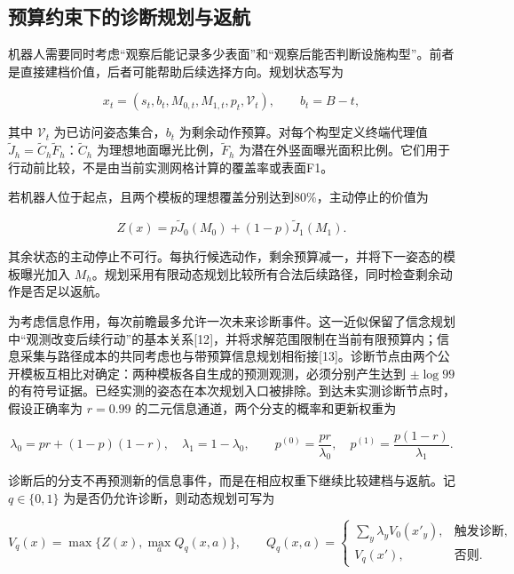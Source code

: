 \documentclass[11pt,a4paper]{article}
\numberwithin{equation}{section}
\begin{document}
\hypertarget{ux9884ux7b97ux7ea6ux675fux4e0bux7684ux8bcaux65adux89c4ux5212ux4e0eux8fd4ux822a}{%
\subsection{预算约束下的诊断规划与返航}\label{ux9884ux7b97ux7ea6ux675fux4e0bux7684ux8bcaux65adux89c4ux5212ux4e0eux8fd4ux822a}}

机器人需要同时考虑``观察后能记录多少表面''和``观察后能否判断设施构型''。前者是直接建档价值，后者可能帮助后续选择方向。规划状态写为

\begin{equation}
x_t=(s_t,b_t,M_{0,t},M_{1,t},p_t,\mathcal V_t),
\qquad b_t=B-t,
\end{equation}

其中 \(\mathcal V_t\) 为已访问姿态集合，\(b_t\) 为剩余动作预算。对每个构型定义终端代理值 \(\widetilde J_h=\widetilde C_h\widetilde F_h\)：\(\widetilde C_h\) 为理想地面曝光比例，\(\widetilde F_h\) 为潜在外竖面曝光面积比例。它们用于行动前比较，不是由当前实测网格计算的覆盖率或表面F1。

若机器人位于起点，且两个模板的理想覆盖分别达到80\%，主动停止的价值为

\begin{equation}
Z(x)=p\widetilde J_0(M_0)+(1-p)\widetilde J_1(M_1).
\end{equation}

其余状态的主动停止不可行。每执行候选动作，剩余预算减一，并将下一姿态的模板曝光加入 \(M_h\)。规划采用有限动态规划比较所有合法后续路径，同时检查剩余动作是否足以返航。

为考虑信息作用，每次前瞻最多允许一次未来诊断事件。这一近似保留了信念规划中``观测改变后续行动''的基本关系{[}12{]}，并将求解范围限制在当前有限预算内；信息采集与路径成本的共同考虑也与带预算信息规划相衔接{[}13{]}。诊断节点由两个公开模板互相比对确定：两种模板各自生成的预测观测，必须分别产生达到 \(\pm\log99\) 的有符号证据。已经实测的姿态在本次规划入口被排除。到达未实测诊断节点时，假设正确率为 \(r=0.99\) 的二元信息通道，两个分支的概率和更新权重为

\begin{equation}
\lambda_0=pr+(1-p)(1-r),\quad \lambda_1=1-\lambda_0,
\qquad p^{(0)}=\frac{pr}{\lambda_0},\quad
p^{(1)}=\frac{p(1-r)}{\lambda_1}.
\end{equation}

诊断后的分支不再预测新的信息事件，而是在相应权重下继续比较建档与返航。记 \(q\in\{0,1\}\) 为是否仍允许诊断，则动态规划可写为

\begin{equation}
V_q(x)=\max\{Z(x),\max_a Q_q(x,a)\},\qquad
Q_q(x,a)=
\begin{cases}
\sum_y\lambda_yV_0(x'_{y}),&\text{触发诊断},\\
V_q(x'),&\text{否则}.
\end{cases}
\end{equation}
\end{document}

